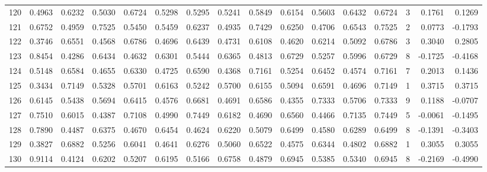 \begin{tabular}{lrrrrrrrrrrrrrrr}
120 &      0.4963 &  0.6232 &  0.5030 &  0.6724 &  0.5298 &  0.5295 &  0.5241 &  0.5849 &  0.6154 &  0.5603 &   0.6432 &     0.6724 &      3 &                    0.1761 &                     0.1269 \\
121 &      0.6752 &  0.4959 &  0.7525 &  0.5450 &  0.5459 &  0.6237 &  0.4935 &  0.7429 &  0.6250 &  0.4706 &   0.6543 &     0.7525 &      2 &                    0.0773 &                    -0.1793 \\
122 &      0.3746 &  0.6551 &  0.4568 &  0.6786 &  0.4696 &  0.6439 &  0.4731 &  0.6108 &  0.4620 &  0.6214 &   0.5092 &     0.6786 &      3 &                    0.3040 &                     0.2805 \\
123 &      0.8454 &  0.4286 &  0.6434 &  0.4632 &  0.6301 &  0.5444 &  0.6365 &  0.4813 &  0.6729 &  0.5257 &   0.5996 &     0.6729 &      8 &                   -0.1725 &                    -0.4168 \\
124 &      0.5148 &  0.6584 &  0.4655 &  0.6330 &  0.4725 &  0.6590 &  0.4368 &  0.7161 &  0.5254 &  0.6452 &   0.4574 &     0.7161 &      7 &                    0.2013 &                     0.1436 \\
125 &      0.3434 &  0.7149 &  0.5328 &  0.5701 &  0.6163 &  0.5242 &  0.5700 &  0.6155 &  0.5094 &  0.6591 &   0.4696 &     0.7149 &      1 &                    0.3715 &                     0.3715 \\
126 &      0.6145 &  0.5438 &  0.5694 &  0.6415 &  0.4576 &  0.6681 &  0.4691 &  0.6586 &  0.4355 &  0.7333 &   0.5706 &     0.7333 &      9 &                    0.1188 &                    -0.0707 \\
127 &      0.7510 &  0.6015 &  0.4387 &  0.7108 &  0.4990 &  0.7449 &  0.6182 &  0.4690 &  0.6560 &  0.4466 &   0.7135 &     0.7449 &      5 &                   -0.0061 &                    -0.1495 \\
128 &      0.7890 &  0.4487 &  0.6375 &  0.4670 &  0.6454 &  0.4624 &  0.6220 &  0.5079 &  0.6499 &  0.4580 &   0.6289 &     0.6499 &      8 &                   -0.1391 &                    -0.3403 \\
129 &      0.3827 &  0.6882 &  0.5256 &  0.6041 &  0.4641 &  0.6276 &  0.5060 &  0.6522 &  0.4575 &  0.6344 &   0.4802 &     0.6882 &      1 &                    0.3055 &                     0.3055 \\
130 &      0.9114 &  0.4124 &  0.6202 &  0.5207 &  0.6195 &  0.5166 &  0.6758 &  0.4879 &  0.6945 &  0.5385 &   0.5340 &     0.6945 &      8 &                   -0.2169 &                    -0.4990 \\

\end{tabular}
